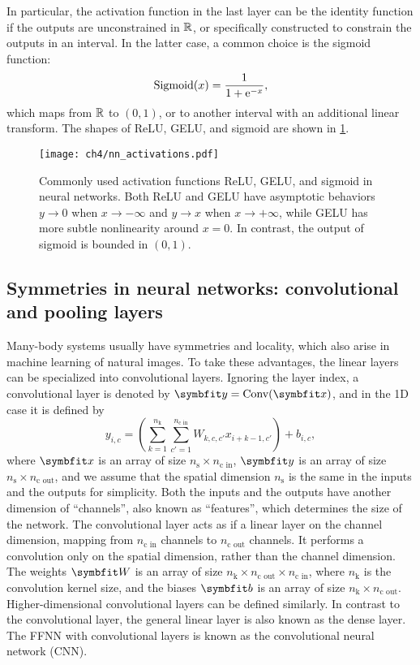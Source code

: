 In particular, the activation function in the last layer can be the identity function if the outputs are unconstrained in $\mathbb{R}$, or specifically constructed to constrain the outputs in an interval. In the latter case, a common choice is the sigmoid function:
\begin{equation}
\text{Sigmoid}(x) = \frac{1}{1 + \mathrm{e}^{-x}},
\label{eq:sigmoid}
\end{equation}
which maps from $\mathbb{R}$ to $(0, 1)$, or to another interval with an additional linear transform. The shapes of ReLU, GELU, and sigmoid are shown in \cref{fig:activations}.

\begin{figure}[htb]
\centering
\texttt{[image: ch4/nn\_activations.pdf]}
\caption[Commonly used activation functions in neural networks]{
Commonly used activation functions ReLU, GELU, and sigmoid in neural networks.
Both ReLU and GELU have asymptotic behaviors $y \to 0$ when $x \to -\infty$ and $y \to x$ when $x \to +\infty$, while GELU has more subtle nonlinearity around $x = 0$.
In contrast, the output of sigmoid is bounded in $(0, 1)$.
}
\label{fig:activations}
\end{figure}

\subsection{Symmetries in neural networks: convolutional and pooling layers}

Many-body systems usually have symmetries and locality, which also arise in machine learning of natural images. To take these advantages, the linear layers can be specialized into convolutional layers. Ignoring the layer index, a convolutional layer is denoted by $\vy = \text{Conv}(\vx)$, and in the 1D case it is defined by
\begin{equation}
y_{i, c} = \left( \sum_{k = 1}^{n_\text{k}} \sum_{c' = 1}^{n_\text{c in}} W_{k, c, c'} x_{i + k - 1, c'} \right) + b_{i, c},
\label{eq:conv-layer}
\end{equation}
where $\vx$ is an array of size $n_\text{s} \times n_\text{c in}$, $\vy$ is an array of size $n_\text{s} \times n_\text{c out}$, and we assume that the spatial dimension $n_\text{s}$ is the same in the inputs and the outputs for simplicity. Both the inputs and the outputs have another dimension of ``channels'', also known as ``features'', which determines the size of the network. The convolutional layer acts as if a linear layer on the channel dimension, mapping from $n_\text{c in}$ channels to $n_\text{c out}$ channels. It performs a convolution only on the spatial dimension, rather than the channel dimension. The weights $\mW$ is an array of size $n_\text{k} \times n_\text{c out} \times n_\text{c in}$, where $n_\text{k}$ is the convolution kernel size, and the biases $\mb$ is an array of size $n_\text{k} \times n_\text{c out}$. Higher-dimensional convolutional layers can be defined similarly. In contrast to the convolutional layer, the general linear layer is also known as the dense layer. The FFNN with convolutional layers is known as the convolutional neural network (CNN).


